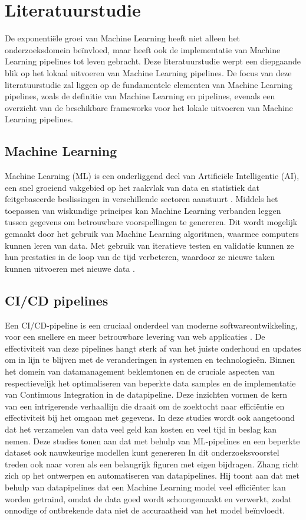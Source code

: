 
\section{Literatuurstudie}%
\label{sec:state-of-the-art}
De exponentiële groei van Machine Learning heeft niet alleen het onderzoeksdomein beïnvloed, maar heeft ook de implementatie van Machine Learning pipelines tot leven gebracht.
Deze literatuurstudie werpt een diepgaande blik op het lokaal uitvoeren van Machine Learning pipelines.
De focus van deze literatuurstudie zal liggen op de fundamentele elementen van Machine Learning pipelines, zoals de definitie van Machine Learning en pipelines, evenals een overzicht van de beschikbare frameworks voor het lokale uitvoeren van Machine Learning pipelines.
\subsection{Machine Learning}
Machine Learning (ML) is een onderliggend deel van Artificiële Intelligentie (AI), een snel groeiend vakgebied op het raakvlak van data en statistiek dat feitgebaseerde beslissingen in verschillende sectoren aanstuurt \autocite{Jordan2015}.
Middels het toepassen van wiskundige principes kan Machine Learning verbanden leggen tussen gegevens om betrouwbare voorspellingen te genereren. Dit wordt mogelijk gemaakt door het gebruik van Machine Learning algoritmen, waarmee computers kunnen leren van data. Met gebruik van iteratieve testen en validatie kunnen ze hun prestaties in de loop van de tijd verbeteren, waardoor ze nieuwe taken kunnen uitvoeren met nieuwe data \autocite{Shaveta2023}.
\subsection{CI/CD pipelines}
Een CI/CD-pipeline is een cruciaal onderdeel van moderne softwareontwikkeling, voor een snellere en meer betrouwbare levering van web applicaties \autocite{Singh2023}.
De effectiviteit van deze pipelines hangt sterk af van het juiste onderhoud en updates om in lijn te blijven met de veranderingen in systemen en technologieën.
Binnen het domein van datamanagement beklemtonen \textcite{Samad2018} en \textcite{RMV2020} de cruciale aspecten van respectievelijk het optimaliseren van beperkte data samples en de implementatie van Continuous Integration in de datapipeline.
Deze inzichten vormen de kern van een intrigerende verhaallijn die draait om de zoektocht naar efficiëntie en effectiviteit bij het omgaan met gegevens. In deze studies wordt ook aangetoond dat het verzamelen van data veel geld kan kosten en veel tijd in beslag kan nemen. Deze studies tonen aan dat met behulp van ML-pipelines en een beperkte dataset ook nauwkeurige modellen kunt genereren
In dit onderzoeksvoorstel treden ook \textcite{Zhang2022} naar voren als een belangrijk figuren met eigen bijdragen.
Zhang richt zich op het ontwerpen en automatiseren van datapipelines. Hij toont aan dat met behulp van datapipelines dat een Machine Learning model veel efficiënter kan worden getraind, omdat de data goed wordt schoongemaakt en verwerkt, zodat onnodige of ontbrekende data niet de accuraatheid van het model beïnvloedt.
